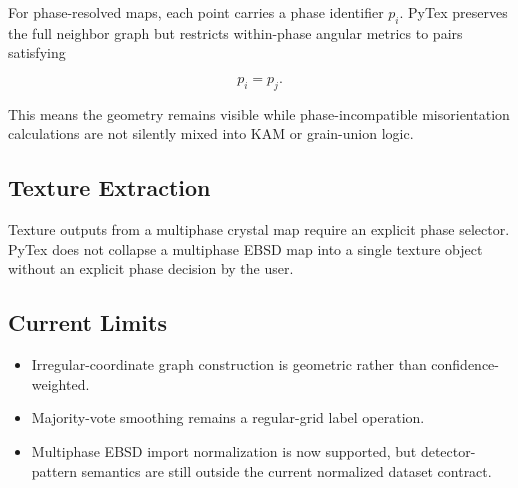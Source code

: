 For phase-resolved maps, each point carries a phase identifier $p_i$. PyTex preserves the full
neighbor graph but restricts within-phase angular metrics to pairs satisfying

\[
p_i = p_j.
\]

This means the geometry remains visible while phase-incompatible misorientation calculations are not
silently mixed into KAM or grain-union logic.

\subsection{Texture Extraction}

Texture outputs from a multiphase crystal map require an explicit phase selector. PyTex does not
collapse a multiphase EBSD map into a single texture object without an explicit phase decision by
the user.

\subsection{Current Limits}

\begin{itemize}
  \item Irregular-coordinate graph construction is geometric rather than confidence-weighted.
  \item Majority-vote smoothing remains a regular-grid label operation.
  \item Multiphase EBSD import normalization is now supported, but detector-pattern semantics are
    still outside the current normalized dataset contract.
\end{itemize}
